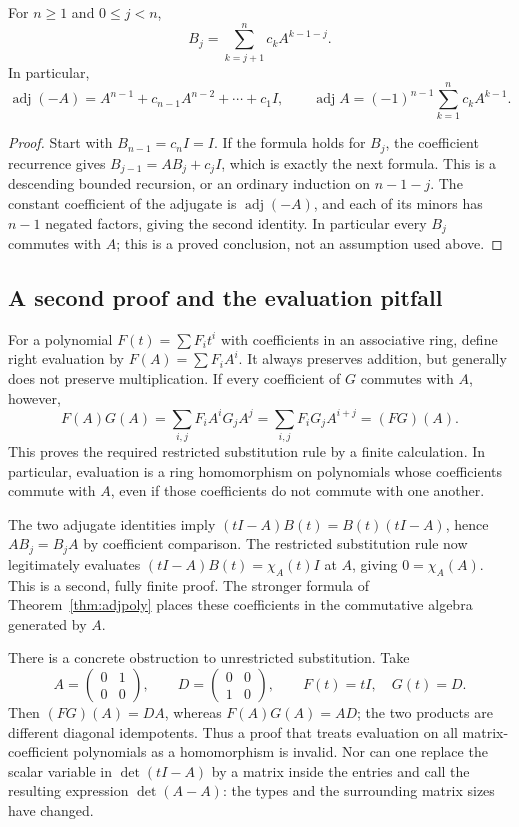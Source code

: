 \begin{theorem}
\label{thm:adjpoly}
For $n\ge1$ and $0\le j<n$,
\[
 B_j=\sum_{k=j+1}^n c_k A^{k-1-j}.
\]
In particular,
\[
 \operatorname{adj}(-A)=A^{n-1}+c_{n-1}A^{n-2}+\cdots+c_1I,
 \qquad
 \operatorname{adj}A=(-1)^{n-1}
              \sum_{k=1}^{n}c_kA^{k-1}.
\]
\end{theorem}
\begin{proof}
Start with $B_{n-1}=c_nI=I$. If the formula holds for $B_j$, the
coefficient recurrence gives $B_{j-1}=AB_j+c_jI$, which is exactly the
next formula. This is a descending bounded recursion, or an ordinary
induction on $n-1-j$. The constant coefficient of the adjugate is
$\operatorname{adj}(-A)$, and each of its minors has $n-1$ negated
factors, giving the second identity. In particular every $B_j$ commutes
with $A$; this is a proved conclusion, not an assumption used above.
\end{proof}

\subsection{A second proof and the evaluation pitfall}

For a polynomial $F(t)=\sum F_it^i$ with coefficients in an associative
ring, define right evaluation by $F(A)=\sum F_iA^i$. It always preserves
addition, but generally does not preserve multiplication. If every
coefficient of $G$ commutes with $A$, however,
\[
 F(A)G(A)=\sum_{i,j}F_iA^iG_jA^j
         =\sum_{i,j}F_iG_jA^{i+j}=(FG)(A).
\]
This proves the required restricted substitution rule by a finite
calculation. In particular, evaluation is a ring homomorphism on
polynomials whose coefficients commute with $A$, even if those
coefficients do not commute with one another.

The two adjugate identities imply
$(tI-A)B(t)=B(t)(tI-A)$, hence $AB_j=B_jA$ by coefficient comparison.
The restricted substitution rule now legitimately evaluates
$(tI-A)B(t)=\chi_A(t)I$ at $A$, giving $0=\chi_A(A)$. This is a second,
fully finite proof. The stronger formula of Theorem~\ref{thm:adjpoly}
places these coefficients in the commutative algebra generated by $A$.

There is a concrete obstruction to unrestricted substitution. Take
\[
 A=\begin{pmatrix}0&1\\0&0\end{pmatrix},\qquad
 D=\begin{pmatrix}0&0\\1&0\end{pmatrix},\qquad F(t)=tI,\quad G(t)=D.
\]
Then $(FG)(A)=DA$, whereas $F(A)G(A)=AD$; the two products are different
diagonal idempotents. Thus a proof that treats evaluation on all
matrix-coefficient polynomials as a homomorphism is invalid.
Nor can one replace the scalar variable in $\det(tI-A)$ by a matrix
inside the entries and call the resulting expression $\det(A-A)$:
the types and the surrounding matrix sizes have changed.

